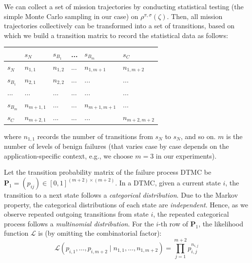 We can collect a set of mission trajectories by conducting 
statistical testing (the simple Monte Carlo sampling in our case) on $\rho^{\pi,\sigma}(\zeta)$. 
Then, all mission trajectories collectively can be transformed into a 
set of transitions, based on which we build a transition matrix to record the statistical data as follows:
\begin{table}[h!]
\centering
\begin{tabular}{l|lllll}
         & $s_N$       & $s_{B_1}$  & ... & $s_{B_m}$      & $s_C$         \\ \hline
$s_N$    & $n_{1,1}$   & $n_{1,2}$ & ... & $n_{1,m+1}$   & $n_{1,m+2}$   \\
$s_{B_1}$ & $n_{2,1}$   & $n_{2,2}$ & ... & ...           & ...           \\
...      & ...         & ...       & ... & ...           & ...           \\
$s_{B_m}$ & $n_{m+1,1}$ & ...       & ... & $n_{m+1,m+1}$ & ...           \\
$s_C$    & $n_{m+2,1}$ & ...       & ... & ...           & $n_{m+2,m+2}$
\end{tabular}
\end{table}
\newline
where $n_{1,1}$ records the number of transitions from $s_N$ to $s_N$, and so on.
$m$ is the number of levels of benign failures (that varies case by case depends on the application-specific context, e.g., we choose $m=3$ in our 
experiments).

Let the transition probability matrix of the failure process DTMC be $\textbf{P}_1=(p_{ij})\in [0,1]^{(m+2)\times (m+2)}$. 
In a DTMC, given a current state $i$, the transition to a next state follows a \textit{categorical distribution}. Due to the Markov property, the categorical distributions of each state are \textit{independent}. Hence, as we observe repeated outgoing transitions from state $i$, the repeated categorical process follows a \textit{multinomial distribution}. For the $i$-th row of $\textbf{P}_1$, the likelihood function $\mathcal{L}$ is (by omitting the combinatorial factor):
\begin{equation}
\label{eq_likelihood_row_i}
\mathcal{L}(  p_{i,1},\dots,p_{i,m+2} \mid n_{1,1},\dots,n_{1,m+2})=\prod_{j=1}^{m+2} p_{i,j}^{n_{i,j}}
\end{equation}

